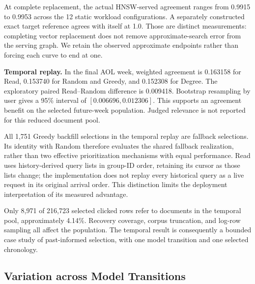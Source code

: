 \documentclass[runningheads]{llncs}
\begin{document}
At complete replacement, the actual HNSW-served agreement ranges from 0.9915 to 0.9953 across the 12 static workload configurations. A separately constructed exact target reference agrees with itself at 1.0. Those are distinct measurements: completing vector replacement does not remove approximate-search error from the serving graph. We retain the observed approximate endpoints rather than forcing each curve to end at one.

\textbf{Temporal replay.} In the final AOL week, weighted agreement is 0.163158 for Read, 0.153740 for Random and Greedy, and 0.152308 for Degree. The exploratory paired Read--Random difference is 0.009418. Bootstrap resampling by user gives a 95\% interval of $[0.006696,0.012306]$. This supports an agreement benefit on the selected future-week population. Judged relevance is not reported for this reduced document pool.

All 1,751 Greedy backfill selections in the temporal replay are fallback selections. Its identity with Random therefore evaluates the shared fallback realization, rather than two effective prioritization mechanisms with equal performance. Read uses history-derived query lists in group-ID order, retaining its cursor as those lists change; the implementation does not replay every historical query as a live request in its original arrival order. This distinction limits the deployment interpretation of its measured advantage.

Only 8,971 of 216,723 selected clicked rows refer to documents in the temporal pool, approximately 4.14\%. Recovery coverage, corpus truncation, and log-row sampling all affect the population. The temporal result is consequently a bounded case study of past-informed selection, with one model transition and one selected chronology.

\subsection{Variation across Model Transitions}
\end{document}
